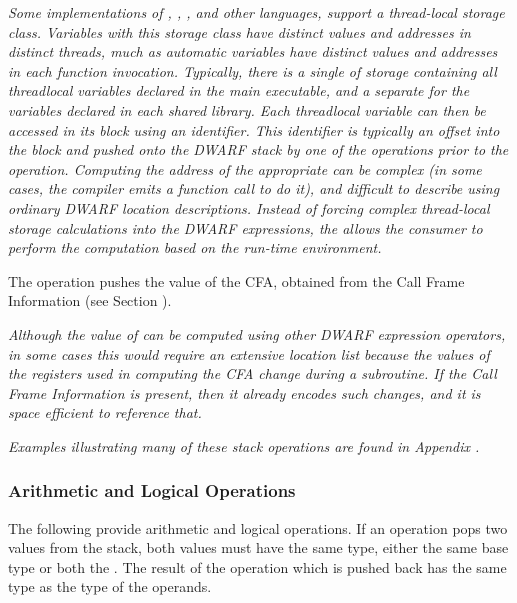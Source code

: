 \begin{enumerate}[1. ]
\textit{Some implementations of 
, , , and other 
languages, support a 
thread-local storage class. Variables with this storage class
have distinct values and addresses in distinct threads, much
as automatic variables have distinct values and addresses in
each function invocation. Typically, there is a single 
of storage containing all thread\dash local variables declared in
the main executable, and a separate  for the variables
declared in each shared library. Each 
thread\dash local variable can then be accessed in its block using an
identifier. This identifier is typically an offset into the block and 
pushed onto the DWARF stack by one of the 
\DWOPconstnx{} operations prior to the
\DWOPformtlsaddress{} operation. 
Computing the address of
the appropriate  can be complex (in some cases, the
compiler emits a function call to do it), and difficult
to describe using ordinary DWARF location descriptions.
Instead of    forcing complex thread-local storage calculations into 
the DWARF expressions, the \DWOPformtlsaddress{} allows the consumer 
to perform the computation based on the run-time environment.}

\itembfnl{\DWOPcallframecfaTARG}
The \DWOPcallframecfaNAME{} 
operation pushes the value of the
CFA, obtained from the Call Frame Information 
(see Section ).

\textit{Although the value of \DWATframebase{}
can be computed using other DWARF expression operators,
in some cases this would require an extensive location list
because the values of the registers used in computing the
CFA change during a subroutine. If the 
Call Frame Information 
is present, then it already encodes such changes, and it is
space efficient to reference that.}
\end{enumerate}

\textit{Examples illustrating many of these stack operations are
found in Appendix .}

\subsubsection{Arithmetic and Logical Operations} 
The following provide arithmetic and logical operations.  If an operation
pops two values from the stack, both values must have the same type,
either the same base type or both the \specialaddresstype.
The result of the operation which is pushed back has the same type
as the type of the operands.  

